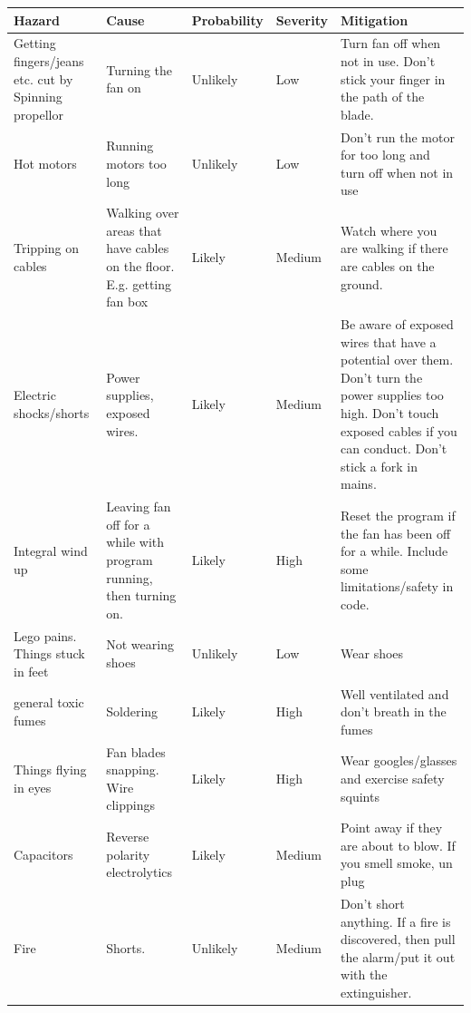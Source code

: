 \documentclass[a4paper, 11pt, compsoc]{IEEEtran}
\begin{document}
            \begin{table}
                \centering
                \begin{tabular}{p{4.5cm}|p{3cm}|l|l|p{4.5cm}}
                    \textbf{Hazard} & \textbf{Cause} & \textbf{Probability} & \textbf{Severity} & \textbf{Mitigation} \\
                    \hline
                    Getting fingers/jeans etc. cut by Spinning propellor & Turning the fan on & Unlikely & Low & Turn fan off when not in use. Don’t stick your finger in the path of the blade. \\
                    \hline
                    Hot motors & Running motors too long & Unlikely & Low & Don’t run the motor for too long and turn off when not in use \\
                    \hline
                    Tripping on cables & Walking over areas that have cables on the floor. E.g. getting fan box & Likely & Medium & Watch where you are walking if there are cables on the ground. \\
                    \hline
                    Electric shocks/shorts & Power supplies, exposed wires. & Likely & Medium & Be aware of exposed wires that have a potential over them. Don’t turn the power supplies too high. Don’t touch exposed cables if you can conduct. Don’t stick a fork in mains. \\
                    \hline
                    Integral wind up & Leaving fan off for a while with program running, then turning on. & Likely & High & Reset the program if the fan has been off for a while. Include some limitations/safety in code. \\
                    \hline
                    Lego pains. Things stuck in feet & Not wearing shoes & Unlikely & Low & Wear shoes \\
                    \hline
                    general toxic fumes & Soldering & Likely & High & Well ventilated and don’t breath in the fumes \\
                    \hline
                    Things flying in eyes & Fan blades snapping. Wire clippings & Likely & High & Wear googles/glasses and exercise safety squints \\
                    \hline
                    Capacitors & Reverse polarity electrolytics & Likely & Medium & Point away if they are about to blow. If you smell smoke, un plug \\
                    \hline
                    Fire & Shorts. & Unlikely & Medium & Don’t short anything. If a fire is discovered, then pull the alarm/put it out with the extinguisher. \\
                    \hline
                \end{tabular}
            \end{table}
\end{document}
